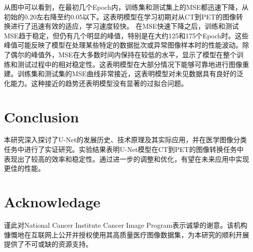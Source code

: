 \documentclass[twocolumn]{article}
\begin{document}
从图中可以看到，在最初几个Epoch内，训练集和测试集上的MSE都迅速下降，从初始的0.20左右降至约0.05以下。这表明模型在学习初期对从CT到PET的图像转换进行了迅速有效的适应，学习速度较快。
在MSE快速下降之后，训练和测试MSE趋于稳定，但仍有几个明显的峰值，特别是在大约125和175个Epoch时。这些峰值可能反映了模型在处理某些特定的数据批次或异常图像样本时的性能波动。除了偶尔的峰值外，MSE在大多数时间内保持在较低的水平，显示了模型在整个训练和测试过程中的相对稳定性。这表明模型在大部分情况下能够可靠地进行图像重建。训练集和测试集的MSE曲线非常接近，这表明模型对未见数据具有良好的泛化能力。这种接近的趋势还表明模型没有显著的过拟合问题。

\section{Conclusion}
本研究深入探讨了U-Net的发展历史、技术原理及其实际应用，并在医学图像分类任务中进行了实证研究。实验结果表明U-Net模型在CT到PET的图像转换任务中表现出了较高的效率和稳定性。通过进一步的调整和优化，有望在未来应用中实现更佳的性能。

\section*{Acknowledage}
谨此对National Cancer Institute Cancer Image Program表示诚挚的谢意。该机构慷慨地在互联网上公开并授权使用其高质量医疗图像数据集，为本研究的顺利开展提供了不可或缺的资源支持。



\end{document}
